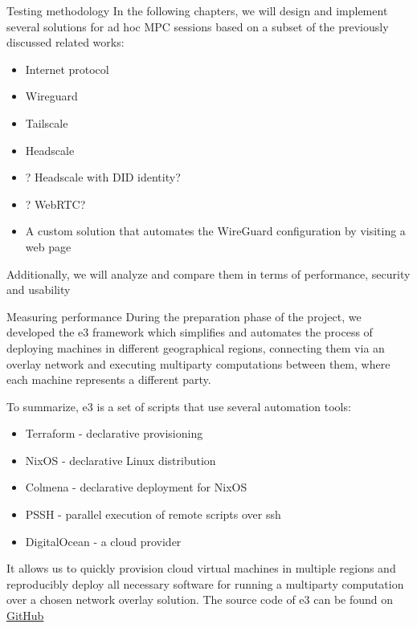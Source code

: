 \hypertarget{thesis__030-methods.md}{}
\begin{frame}{Testing methodology}
\protect\hypertarget{thesis__030-methods.md__testing-methodology}{}
In the following chapters, we will design and implement several
solutions for ad hoc MPC sessions based on a subset of the previously
discussed related works:

\begin{itemize}
\tightlist
\item
  Internet protocol
\item
  Wireguard
\item
  Tailscale
\item
  Headscale
\item
  ? Headscale with DID identity?
\item
  ? WebRTC?
\item
  A custom solution that automates the WireGuard configuration by
  visiting a web page
\end{itemize}

Additionally, we will analyze and compare them in terms of performance,
security and usability

\begin{block}{Measuring performance}
\protect\hypertarget{thesis__030-methods.md__measuring-performance}{}
During the preparation phase of the project, we developed the \gls{e3}
framework which simplifies and automates the process of deploying
machines in different geographical regions, connecting them via an
overlay network and executing multiparty computations between them,
where each machine represents a different party.

To summarize, \gls{e3} is a set of scripts that use several automation
tools:

\begin{itemize}
\tightlist
\item
  Terraform - declarative provisioning
\item
  NixOS - declarative Linux distribution
\item
  Colmena - declarative deployment for NixOS
\item
  PSSH - parallel execution of remote scripts over ssh
\item
  DigitalOcean - a cloud provider
\end{itemize}

It allows us to quickly provision cloud virtual machines in multiple
regions and reproducibly deploy all necessary software for running a
multiparty computation over a chosen network overlay solution. The
source code of \gls{e3} can be found on
\href{https://github.com/e-nikolov/mpyc}{GitHub}


\end{block}
\end{frame}
